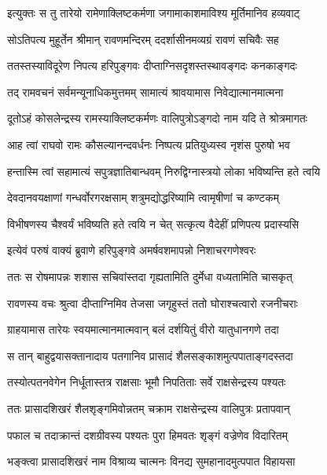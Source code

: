 \twolineshloka
{इत्युक्तः स तु तारेयो रामेणाक्लिष्टकर्मणा}
{जगामाकाशमाविश्य मूर्तिमानिव हव्यवाट्} %

\twolineshloka
{सोऽतिपत्य मुहूर्तेन श्रीमान् रावणमन्दिरम्}
{ददर्शासीनमव्यग्रं रावणं सचिवैः सह} %

\twolineshloka
{ततस्तस्याविदूरेण निपत्य हरिपुङ्गवः}
{दीप्ताग्निसदृशस्तस्थावङ्गदः कनकाङ्गदः} %

\twolineshloka
{तद् रामवचनं सर्वमन्यूनाधिकमुत्तमम्}
{सामात्यं श्रावयामास निवेद्यात्मानमात्मना} %

\twolineshloka
{दूतोऽहं कोसलेन्द्रस्य रामस्याक्लिष्टकर्मणः}
{वालिपुत्रोऽङ्गदो नाम यदि ते श्रोत्रमागतः} %

\twolineshloka
{आह त्वां राघवो रामः कौसल्यानन्दवर्धनः}
{निष्पत्य प्रतियुध्यस्व नृशंस पुरुषो भव} %

\twolineshloka
{हन्तास्मि त्वां सहामात्यं सपुत्रज्ञातिबान्धवम्}
{निरुद्विग्नास्त्रयो लोका भविष्यन्ति हते त्वयि} %

\twolineshloka
{देवदानवयक्षाणां गन्धर्वोरगरक्षसाम्}
{शत्रुमद्योद्धरिष्यामि त्वामृषीणां च कण्टकम्} %

\twolineshloka
{विभीषणस्य चैश्वर्यं भविष्यति हते त्वयि}
{न चेत् सत्कृत्य वैदेहीं प्रणिपत्य प्रदास्यसि} %

\twolineshloka
{इत्येवं परुषं वाक्यं ब्रुवाणे हरिपुङ्गवे}
{अमर्षवशमापन्नो निशाचरगणेश्वरः} %

\twolineshloka
{ततः स रोषमापन्नः शशास सचिवांस्तदा}
{गृह्यतामिति दुर्मेधा वध्यतामिति चासकृत्} %

\twolineshloka
{रावणस्य वचः श्रुत्वा दीप्ताग्निमिव तेजसा}
{जगृहुस्तं ततो घोराश्चत्वारो रजनीचराः} %

\twolineshloka
{ग्राहयामास तारेयः स्वयमात्मानमात्मवान्}
{बलं दर्शयितुं वीरो यातुधानगणे तदा} %

\twolineshloka
{स तान् बाहुद्वयासक्तानादाय पतगानिव}
{प्रासादं शैलसङ्काशमुत्पपाताङ्गदस्तदा} %

\twolineshloka
{तस्योत्पतनवेगेन निर्धूतास्तत्र राक्षसाः}
{भूमौ निपतिताः सर्वे राक्षसेन्द्रस्य पश्यतः} %

\twolineshloka
{ततः प्रासादशिखरं शैलशृङ्गमिवोन्नतम्}
{चक्राम राक्षसेन्द्रस्य वालिपुत्रः प्रतापवान्} %

\twolineshloka
{पफाल च तदाक्रान्तं दशग्रीवस्य पश्यतः}
{पुरा हिमवतः शृङ्गं वज्रेणेव विदारितम्} %

\twolineshloka
{भङ्क्त्वा प्रासादशिखरं नाम विश्राव्य चात्मनः}
{विनद्य सुमहानादमुत्पपात विहायसा} %

